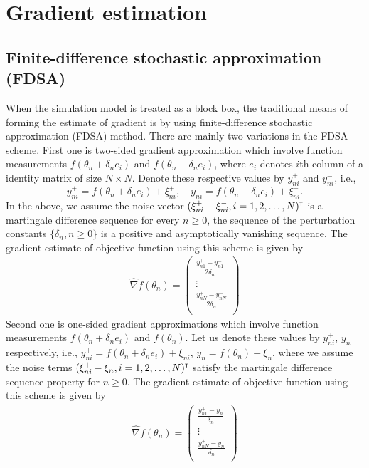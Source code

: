 \section{Gradient estimation}\label{sec:gradest}
\subsection{Finite-difference stochastic approximation (FDSA)}
When the simulation model is treated as a block box, the traditional means of forming the estimate of gradient is by using finite-difference stochastic approximation (FDSA) method. There are mainly two variations in the FDSA scheme. First one is  two-sided gradient approximation which involve function measurements $f(\theta_n + \delta_n e_i)$ and $f(\theta_n - \delta_n e_i)$, where $e_i$ denotes $i$th column of a identity matrix of size $N \times N$. Denote these respective values by $y_{ni}^+$ and $y_{ni}^-$, i.e., 
$$
y_{ni}^+ = f(\theta_n+\delta_n e_i) + \xi_{ni}^+,\quad y_{ni}^- = f(\theta_n-\delta_n e_i) + \xi_{ni}^-.
$$
In the above, we assume the noise vector $(\xi_{ni}^+ - \xi_{ni}^-, i=1,2,\ldots,N)^\mathsf{\scriptscriptstyle T}$ is a martingale difference sequence for every $n \ge 0$, the sequence of the perturbation constants $\{\delta_n, n\ge 0\}$ is a positive and asymptotically vanishing sequence. The gradient estimate of objective function using this scheme is given by
\begin{align}\label{eq:twofdsa}
 \widehat{\nabla} f(\theta_{n}) = \left(
\begin{array}{c}
\frac{y_{n1}^+ - y_{n1}^-}{2\delta_n}\\
\vdots\\
\frac{y_{nN}^+ - y_{nN}^-}{2\delta_n}\\
\end{array}
\right)
\end{align}
Second one is  one-sided gradient approximations which involve function measurements $f(\theta_n+\delta_n e_i)$ and $f(\theta_n)$. Let us denote these values by  $y_{ni}^+$, $y_{n}$  respectively, i.e., 
$y_{ni}^+ = f(\theta_n+\delta_n e_i) + \xi_{ni}^+$, $y_{n} = f(\theta_n) + \xi_n$,  where we assume the noise terms $(\xi_{ni}^+ - \xi_{n}, i=1,2,\ldots,N)^\mathsf{\scriptscriptstyle T}$ satisfy the martingale difference sequence property for $n \ge 0$. The gradient estimate of objective function using this scheme is given by
\begin{align}\label{eq:onefdsa}
 \widehat{\nabla} f(\theta_{n}) = \left(
\begin{array}{c}
\frac{y_{n1}^+ - y_{n}}{\delta_n}\\
\vdots\\
\frac{y_{nN}^+ - y_{n}}{\delta_n}\\
\end{array}
\right)
\end{align}
